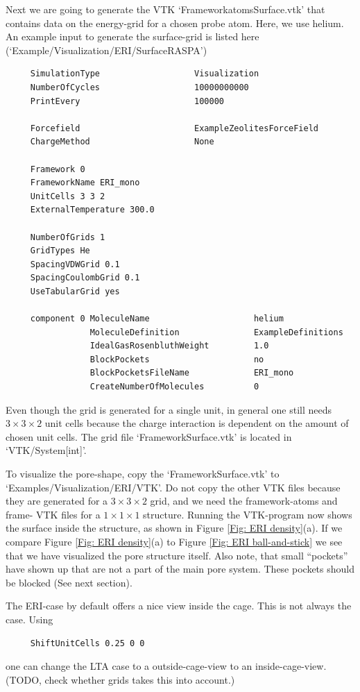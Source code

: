 Next we are going to generate the VTK `FrameworkatomsSurface.vtk' that contains data on the energy-grid for a chosen
probe atom. Here, we use helium.
An example input to generate the surface-grid is listed here (`Example/Visualization/ERI/SurfaceRASPA')
\begin{verbatim}
     SimulationType                   Visualization
     NumberOfCycles                   10000000000
     PrintEvery                       100000

     Forcefield                       ExampleZeolitesForceField
     ChargeMethod                     None

     Framework 0
     FrameworkName ERI_mono
     UnitCells 3 3 2
     ExternalTemperature 300.0

     NumberOfGrids 1
     GridTypes He
     SpacingVDWGrid 0.1
     SpacingCoulombGrid 0.1
     UseTabularGrid yes

     component 0 MoleculeName                     helium
                 MoleculeDefinition               ExampleDefinitions
                 IdealGasRosenbluthWeight         1.0
                 BlockPockets                     no
                 BlockPocketsFileName             ERI_mono
                 CreateNumberOfMolecules          0
\end{verbatim}

Even though the grid is generated for a single unit, in general one still needs $3\times3\times2$ unit cells because
the charge interaction is dependent on the amount of chosen unit cells.
The grid file `FrameworkSurface.vtk' is located in `VTK/System[int]'.

To visualize the pore-shape, copy the `FrameworkSurface.vtk' to `Examples/Visualization/ERI/VTK'. Do not copy the other VTK files
because they are generated for a $3\times3\times2$ grid, and we need the framework-atoms and frame- VTK files
for a $1\times1\times1$ structure.
Running the VTK-program now shows the surface inside the structure, as shown in
Figure \ref{Fig: ERI density}(a). If we compare Figure \ref{Fig: ERI density}(a) to Figure \ref{Fig: ERI ball-and-stick}
we see that we have visualized the pore structure itself. Also note, that small ``pockets'' have shown up that are not a
part of the main pore system. These pockets should be blocked (See next section).

The ERI-case by default offers a nice view inside the cage. This is not always the case. Using
\begin{verbatim}
     ShiftUnitCells 0.25 0 0 
\end{verbatim}
one can change the LTA case to a outside-cage-view to an inside-cage-view. (TODO, check whether grids takes this into account.)

